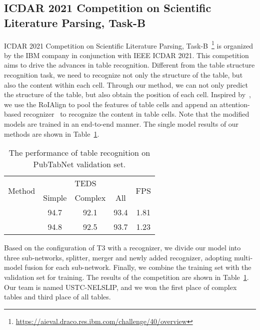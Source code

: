 \documentclass[review]{elsarticle}
\begin{document}
\subsection{ICDAR 2021 Competition on Scientific Literature Parsing, Task-B}
ICDAR 2021 Competition on Scientific Literature Parsing, Task-B~\footnote{\label{pubtabnet-competition}\url{https://aieval.draco.res.ibm.com/challenge/40/overview}} is organized by the IBM company in conjunction with IEEE ICDAR 2021. This competition aims to drive the advances in table recognition. Different from the table structure recognition task, we need to recognize not only the structure of the table, but also the content within each cell. Through our method, we can not only predict the structure of the table, but also obtain the position of each cell. Inspired by~\cite{ABCNet,MaskTextSpotterV1,MaskTextSpotterV2,MaskTextSpotterV3}, we use the RoIAlign to pool the features of table cells and append an attention-based recognizer~\cite{WAP} to recognize the content in table cells. Note that the modified models are trained in an end-to-end manner. The single model results of our methods are shown in Table~\ref{e2e-comparsion}.

\begin{table}[!htp]
	\centering
	\renewcommand\arraystretch{1.1}
	\setlength{\tabcolsep}{4mm}
	
	\caption{The performance of table recognition on PubTabNet validation set.}
	\label{e2e-comparsion}
	\begin{tabular}{c|c|c|c|c}
		\hline
		\multirow{2}{*}{Method} & \multicolumn{3}{c|}{TEDS} & \multirow{2}{*}{FPS}  \\ \cline{2-4} 
		& Simple  & Complex  & All &         \\ \hline
		   & 94.7 & 92.1 & 93.4 & 1.81 \\
			& 94.8 & 92.5 & 93.7 & 1.23 \\ \hline
	\end{tabular}
\end{table}

Based on the configuration of T3 with a recognizer, we divide our model into three sub-networks, splitter, merger and newly added recognizer, adopting multi-model fusion for each sub-network. Finally, we combine the training set with the validation set for training. The results of the competition are shown in Table~\ref{pubtabnet-competition}. Our team is named USTC-NELSLIP, and we won the first place of complex tables and third place of all tables.
\end{document}
